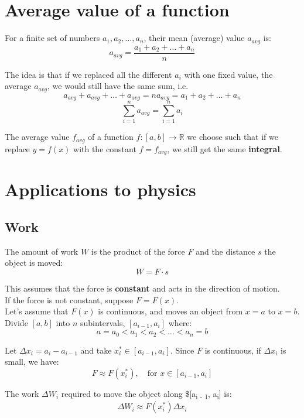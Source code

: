 \documentclass[11pt]{article}
\begin{document}
\newpage

\section{Average value of a function}
\label{sec:org957eaf1}
For a finite set of numbers \(a_1, a_2, \ldots, a_n\), their mean (average) value \(a_{avg}\) is:
\[a_{avg} = \frac{a_1 + a_2 + \ldots + a_n}{n}\]

The idea is that if we replaced all the different \(a_i\) with one fixed value, the average \(a_{avg}\), we would still have the same sum, i.e.
\[a_{avg} + a_{avg} + \ldots + a_{avg} = na_{avg} = a_1 + a_2 + \ldots + a_n\]
\[\sum_{i = 1}^n a_{avg} = \sum_{i = 1}^n a_i\]

The average value \(f_{avg}\) of a function \(f : [a, b] \rightarrow \mathbb{R}\) we choose such that if we replace \(y = f(x)\) with the constant \(f = f_{avg}\), we still get the same \textbf{integral}.

\newpage

\section{Applications to physics}
\label{sec:org0b134e9}

\subsection{Work}
\label{sec:org6646fc9}
The amount of work \(W\) is the product of the force \(F\) and the distance \(s\) the object is moved:
\[W = F \cdot s\]

This assumes that the force is \textbf{constant} and acts in the direction of motion.
\\[0pt]

If the force is not constant, suppose \(F = F(x)\).
\\[0pt]

Let's assume that \(F(x)\) is continuous, and moves an object from \(x = a\) to \(x = b\). Divide \([a, b]\) into \(n\) subintervals, \([a_{i - 1}, a_i]\) where:
\[a = a_0 < a_ 1 < a_2 < \ldots < a_n = b\]

Let \(\Delta x_i = a_i - a_{i - 1}\) and take \(x_i^* \in [a_{i - 1}, a_i]\). Since \(F\) is continuous, if \(\Delta x_i\) is small, we have:
\[F \approx F(x_i^*), \quad \text{for } x \in [a_{i - 1}, a_i]\]

The work \(\Delta W_i\) required to move the object along \$[a\textsubscript{i - 1}, a\textsubscript{i}] is:
\[\Delta W_i \approx F(x_i^*) \Delta x_i\]
\end{document}
